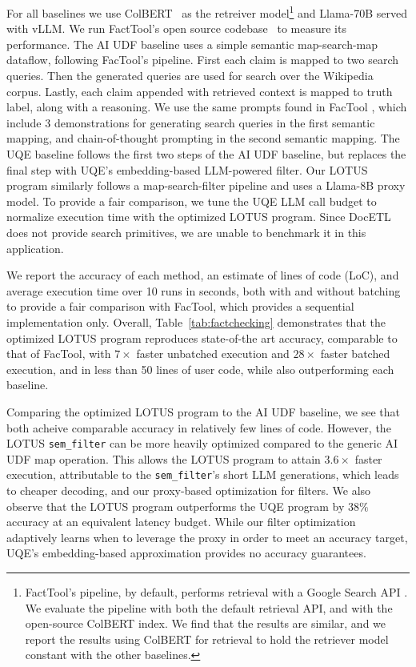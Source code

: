 For all baselines we use ColBERT~\cite{khattab_colbert_2020} as the retreiver model\footnote{FactTool's pipeline, by default, performs retrieval with a Google Search API \cite{noauthor_custom_nodate}. We evaluate the pipeline with both the default retrieval API, and with the open-source ColBERT \cite{khattab_colbert_2020} index. We find that the results are similar, and we report the results using ColBERT for retrieval to hold the retriever model constant with the other baselines.} and Llama-70B served with vLLM. We run FactTool's open source codebase~\cite{noauthor_gair-nlpfactool_nodate} to measure its performance.
The AI UDF baseline uses a simple semantic map-search-map dataflow, following FacTool's pipeline. First each claim is mapped to two search queries. Then the generated queries are used for search over the Wikipedia corpus. Lastly, each claim appended with retrieved context is mapped to truth label, along with a reasoning. We use the same prompts found in FacTool \cite{noauthor_gair-nlpfactool_nodate}, which include 3 demonstrations for generating search queries in the first semantic mapping, and chain-of-thought prompting in the second semantic mapping. The UQE baseline follows the first two steps of the AI UDF baseline, but replaces the final step with UQE's embedding-based LLM-powered filter. Our LOTUS program similarly follows a map-search-filter pipeline and uses a Llama-8B proxy model. To provide a fair comparison, we tune the UQE LLM call budget to normalize execution time with the optimized LOTUS program. Since DocETL does not provide search primitives, we are unable to benchmark it in this application.






 We report the accuracy of each method, an estimate of lines of code (LoC), and average execution time over 10 runs in seconds, both with and without batching to provide a fair comparison with FacTool, which provides a sequential implementation only. 
Overall, Table~\ref{tab:factchecking} demonstrates that the optimized LOTUS program reproduces state-of-the art accuracy, comparable to that of FacTool, with $7\times$ faster unbatched execution and $28\times$ faster batched execution, and in less than 50 lines of user code, while also outperforming each baseline. 

Comparing the optimized LOTUS program to the AI UDF baseline, we see that both acheive comparable accuracy in relatively few lines of code. However, the LOTUS \verb|sem_filter| can be more heavily optimized compared to the generic AI UDF map operation. This allows the LOTUS program to attain $3.6\times$ faster execution, attributable to the \verb|sem_filter|'s short LLM generations, which leads to cheaper decoding, and our proxy-based optimization for filters. We also observe that the LOTUS program outperforms the UQE program by $38\%$ accuracy at an equivalent latency budget. While our filter optimization adaptively learns when to leverage the proxy in order to meet an accuracy target, UQE's embedding-based approximation provides no accuracy guarantees. 


